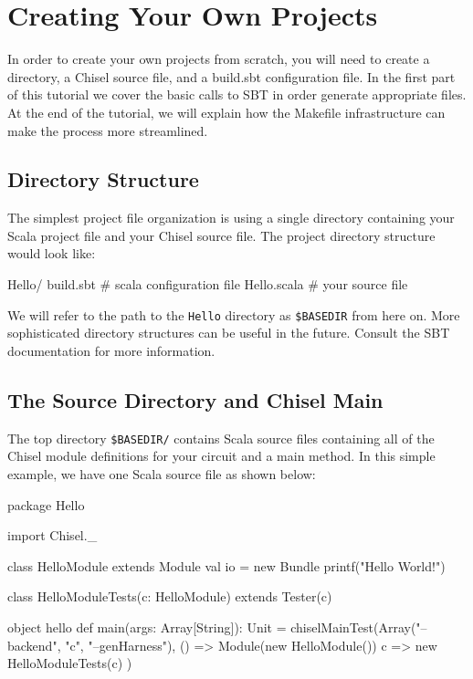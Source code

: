 \section{Creating Your Own Projects}

In order to create your own projects from scratch, you will need to create a directory, a Chisel source file, and a build.sbt configuration file. In the first part of this tutorial we cover the basic calls to SBT in order generate appropriate files. At the end of the tutorial, we will explain how the Makefile infrastructure can make the process more streamlined.

\subsection{Directory Structure}

The simplest project file organization is using a single directory containing your Scala project file and your Chisel source file.  The project directory structure would look like:

\begin{bash}
Hello/
  build.sbt   # scala configuration file
  Hello.scala # your source file
\end{bash}

We will refer to the path to the \verb+Hello+ directory as \verb+$BASEDIR+ from here on.  More sophisticated directory structures can be useful in the future.  Consult the SBT documentation for more information.

\subsection{The Source Directory and Chisel Main}

The top directory \verb+$BASEDIR/+ contains Scala source files containing all of the Chisel module definitions for your circuit and a main method.  In this simple example, we have one Scala source file as shown below:

\begin{scala}
package Hello

import Chisel._

class HelloModule extends Module {
  val io = new Bundle {}
  printf("Hello World!\n")
}

class HelloModuleTests(c: HelloModule) extends Tester(c) {
}

object hello {
  def main(args: Array[String]): Unit = {
    chiselMainTest(Array("--backend", "c", "--genHarness"),
      () => Module(new HelloModule()) {
        c => new HelloModuleTests(c)
      })
  }
}
\end{scala}

